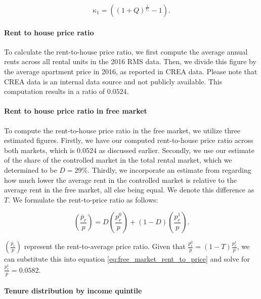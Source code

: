 \documentclass[parskip=full]{article}
\begin{document}
\begin{equation}\label{eq:computing_annual_decrease}
    \kappa_{1}=((1+Q)^{\frac{1}{Y_{c}}}-1).
\end{equation}

\paragraph{Rent to house price ratio}

To calculate the rent-to-house price ratio, we first compute the average annual rents across all rental units in the 2016 RMS data. Then, we divide this figure by the average apartment price in 2016, as reported in CREA data. Please note that CREA data is an internal data source and not publicly available. This computation results in a ratio of $0.0524$.

\paragraph{Rent to house price ratio in free market}

To compute the rent-to-house price ratio in the free market, we utilize three estimated figures. Firstly, we have our computed rent-to-house price ratio across both markets, which is $0.0524$ as discussed earlier. Secondly, we use our estimate of the share of the controlled market in the total rental market, which we determined to be $D=29\%$. Thirdly, we incorporate an estimate from \citet{zhang-gou} regarding how much lower the average rent in the controlled market is relative to the average rent in the free market, all else being equal. We denote this difference as $T$. We formulate the rent-to-price ratio as follows:

\begin{equation}\label{eq:free_market_rent_to_price}
    {\left(\frac{\overline{p}_{r}}{p}\right)}=D \left(\frac{p^{0}_{r}}{p}\right)+(1-D) \left(\frac{p^{1}_{r}}{p}\right).
\end{equation}

\noindent $\left(\frac{\overline{p}_{r}}{p}\right)$ represent the rent-to-average price ratio. Given that $\frac{p^{0}_{r}}{p}=(1-T)\frac{p^{1}_{r}}{p}$, we can substitute this into equation \eqref{eq:free_market_rent_to_price} and solve for $\frac{p^{1}_{r}}{p}=0.0582$.

\paragraph{Tenure distribution by income quintile}
\end{document}
